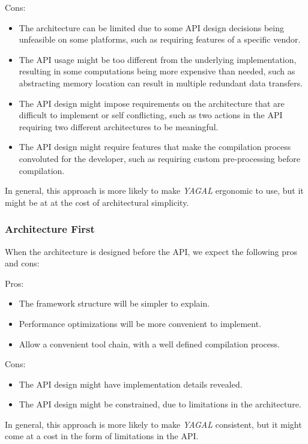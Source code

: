 Cons:
\begin{itemize}
\item The architecture can be limited due to some API design decisions being unfeasible on some platforms, such as requiring features of a specific vendor.
\item The API usage might be too different from the underlying implementation, resulting in some computations being more expensive than needed, such as abstracting memory location can result in multiple redundant data transfers.
\item The API design might impose requirements on the architecture that are difficult to implement or self conflicting, such as two actions in the API requiring two different architectures to be meaningful.
\item The API design might require features that make the compilation process convoluted for the developer, such as requiring custom pre-processing before compilation.
\end{itemize}

In general, this approach is more likely to make \textit{YAGAL} ergonomic to use, but it might be at at the cost of architectural simplicity. 

\subsubsection{Architecture First}
When the architecture is designed before the API, we expect the following pros and cons:

Pros:
\begin{itemize}
\item The framework structure will be simpler to explain.
\item Performance optimizations will be more convenient to implement.
\item Allow a convenient tool chain, with a well defined compilation process.
\end{itemize}

Cons:
\begin{itemize}
\item The API design might have implementation details revealed.
\item The API design might be constrained, due to limitations in the architecture.
\end{itemize}

In general, this approach is more likely to make \textit{YAGAL} consistent, but it might come at a cost in the form of limitations in the API. 

